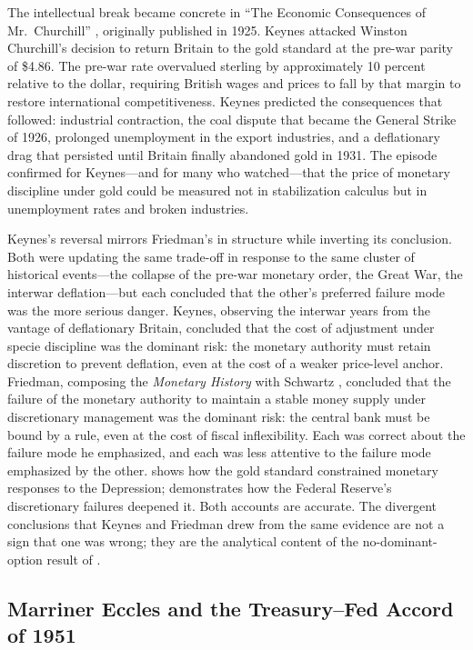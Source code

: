 \documentclass[12pt]{article}
\begin{document}
The intellectual break became concrete in ``The Economic Consequences of
Mr.~Churchill'' \citep{Keynes1931}, originally published in 1925.
Keynes attacked Winston Churchill's decision to return Britain to the
gold standard at the pre-war parity of \$4.86.  The pre-war rate
overvalued sterling by approximately 10 percent relative to the dollar,
requiring British wages and prices to fall by that margin to restore
international competitiveness.  Keynes predicted the
consequences that followed: industrial contraction, the coal dispute that
became the General Strike of 1926, prolonged unemployment in the export
industries, and a deflationary drag that persisted until Britain finally
abandoned gold in 1931.  The episode confirmed for Keynes---and for many
who watched---that the price of monetary discipline under gold could be
measured not in stabilization calculus but in unemployment
rates and broken industries.

Keynes's reversal mirrors Friedman's in structure while inverting its
conclusion.
Both were updating the same trade-off in response to the same cluster of
historical events---the collapse of the pre-war monetary order, the Great
War, the interwar deflation---but each concluded that the other's
preferred failure mode was the more serious danger.  Keynes, observing the
interwar years from the vantage of deflationary Britain, concluded that
the cost of adjustment under specie discipline was the dominant risk:
the monetary authority must retain discretion to prevent deflation, even
at the cost of a weaker price-level anchor.  Friedman, composing the
\textit{Monetary History} with Schwartz \citep{FriedmanSchwartz1963},
concluded that the failure of the monetary authority to maintain a stable
money supply under discretionary management was the dominant risk: the
central bank must be bound by a rule, even at the cost of fiscal
inflexibility.  Each was correct about the failure mode he emphasized, and
each was less attentive to the failure mode emphasized by the other.
\citet{Eichengreen1992} shows how the gold standard constrained
monetary responses to the Depression; \citet{FriedmanSchwartz1963}
demonstrates how the Federal Reserve's discretionary failures deepened it.
Both accounts are accurate.  The divergent conclusions that Keynes and
Friedman drew from the same evidence are not a sign that one was wrong;
they are the analytical content of the no-dominant-option result of
\citet{Sargent2011}.

\subsection{Marriner Eccles and the Treasury--Fed Accord of 1951}
\end{document}
